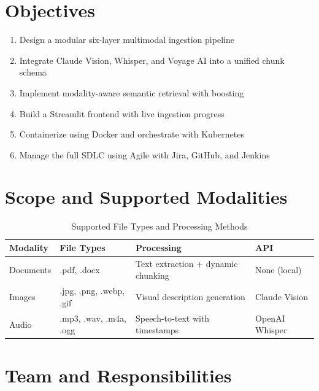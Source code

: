 \documentclass[12pt,a4paper]{report}
\begin{document}
\section{Objectives}

\begin{enumerate}[leftmargin=2cm]
    \item Design a modular six-layer multimodal ingestion pipeline
    \item Integrate Claude Vision, Whisper, and Voyage AI into a unified chunk schema
    \item Implement modality-aware semantic retrieval with boosting
    \item Build a Streamlit frontend with live ingestion progress
    \item Containerize using Docker and orchestrate with Kubernetes
    \item Manage the full SDLC using Agile with Jira, GitHub, and Jenkins
\end{enumerate}

\section{Scope and Supported Modalities}

\begin{table}[H]
\centering
\caption{Supported File Types and Processing Methods}
\begin{tabular}{p{2.5cm}p{3.5cm}p{3.5cm}p{3.5cm}}
\toprule
\textbf{Modality} & \textbf{File Types} & \textbf{Processing} & \textbf{API} \\
\midrule
Documents & .pdf, .docx & Text extraction + dynamic chunking & None (local) \\
Images & .jpg, .png, .webp, .gif & Visual description generation & Claude Vision \\
Audio & .mp3, .wav, .m4a, .ogg & Speech-to-text with timestamps & OpenAI Whisper \\
\bottomrule
\end{tabular}
\end{table}

\section{Team and Responsibilities}
\end{document}
